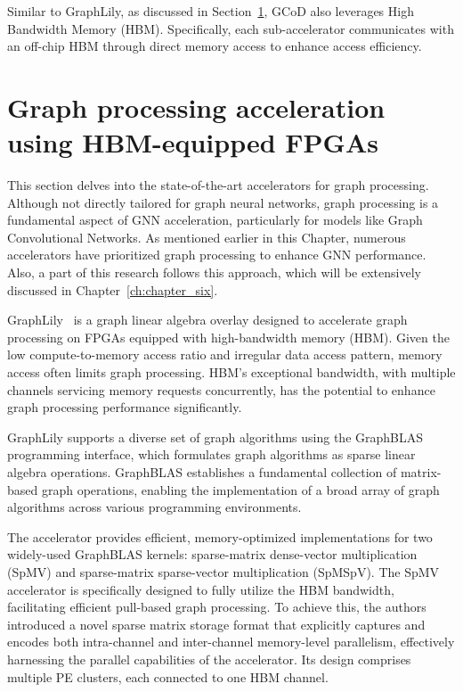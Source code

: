 Similar to GraphLily, as discussed in Section~\ref{sec:hbm-equipped-fpga-accelerators}, GCoD also leverages High Bandwidth Memory (HBM).
Specifically, each sub-accelerator communicates with an off-chip HBM through direct memory access to enhance access efficiency.

\section{Graph processing acceleration using HBM-equipped FPGAs}
\label{sec:hbm-equipped-fpga-accelerators}%

This section delves into the state-of-the-art accelerators for graph processing.
Although not directly tailored for graph neural networks, graph processing is a fundamental aspect of GNN acceleration, particularly for models like Graph Convolutional Networks.
As mentioned earlier in this Chapter, numerous accelerators have prioritized graph processing to enhance GNN performance.
Also, a part of this research follows this approach, which will be extensively discussed in Chapter~\ref{ch:chapter_six}.

GraphLily~\cite{9643582} is a graph linear algebra overlay designed to accelerate graph processing on FPGAs equipped with high-bandwidth memory (HBM).
Given the low compute-to-memory access ratio and irregular data access pattern, memory access often limits graph processing.
HBM's exceptional bandwidth, with multiple channels servicing memory requests concurrently, has the potential to enhance graph processing performance significantly.

GraphLily supports a diverse set of graph algorithms using the GraphBLAS~\cite{DBLP:journals/corr/KepnerABBFGHKLM16} programming interface, which formulates graph algorithms as sparse linear algebra operations.
GraphBLAS establishes a fundamental collection of matrix-based graph operations, enabling the implementation of a broad array of graph algorithms across various programming environments.

The accelerator provides efficient, memory-optimized implementations for two widely-used GraphBLAS kernels: sparse-matrix dense-vector multiplication (SpMV) and sparse-matrix sparse-vector multiplication (SpMSpV).
The SpMV accelerator is specifically designed to fully utilize the HBM bandwidth, facilitating efficient pull-based graph processing.
To achieve this, the authors introduced a novel sparse matrix storage format that explicitly captures and encodes both intra-channel and inter-channel memory-level parallelism, effectively harnessing the parallel capabilities of the accelerator. Its design comprises multiple PE clusters, each connected to one HBM channel.

